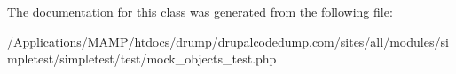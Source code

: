 The documentation for this class was generated from the following file:\begin{DoxyCompactItemize}
\item 
/Applications/MAMP/htdocs/drump/drupalcodedump.com/sites/all/modules/simpletest/simpletest/test/mock\_\-objects\_\-test.php\end{DoxyCompactItemize}
